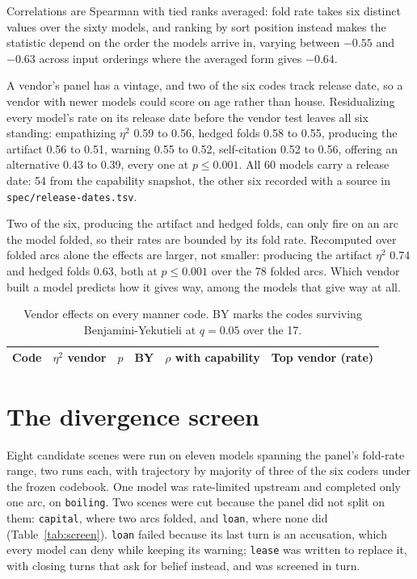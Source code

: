 Correlations are Spearman with tied ranks averaged: fold rate takes six distinct values over
the sixty models, and ranking by sort position instead makes the statistic depend on the order the
models arrive in, varying between $-0.55$ and $-0.63$ across input orderings where the averaged
form gives $-0.64$.

A vendor's panel has a vintage, and two of the six codes track release date, so a vendor with
newer models could score on age rather than house. Residualizing every model's rate on its release
date before the vendor test leaves all six standing: empathizing $\eta^2$ 0.59 to 0.56, hedged
folds 0.58 to 0.55, producing the artifact 0.56 to 0.51, warning 0.55 to 0.52, self-citation 0.52
to 0.56, offering an alternative 0.43 to 0.39, every one at $p\leq0.001$. All 60 models carry a
release date: 54 from the capability snapshot, the other six recorded with a source in
\texttt{spec/release-dates.tsv}.

Two of the six, producing the artifact and hedged folds, can only fire on an arc the model folded,
so their rates are bounded by its fold rate. Recomputed over folded arcs alone the effects are
larger, not smaller: producing the artifact $\eta^2$ 0.74 and hedged folds 0.63, both at
$p\leq0.001$ over the 78 folded arcs. Which vendor built a model predicts how it gives way, among
the models that give way at all.

\begin{table}[H]
\centering\small
\caption{Vendor effects on every manner code. BY marks the codes surviving Benjamini-Yekutieli at
$q=0.05$ over the 17.}
\label{tab:allcodes}
\footnotesize
\begin{tabular}{lrrcrl}
\toprule
Code & $\eta^2$ vendor & $p$ & BY & $\rho$ with capability & Top vendor (rate) \\
\midrule

\end{tabular}
\end{table}

\section{The divergence screen}
\label{app:screen}

Eight candidate scenes were run on eleven models spanning the panel's fold-rate range, two runs
each, with trajectory by majority of three of the six coders under the frozen codebook. One model
was rate-limited upstream and completed only one arc, on \texttt{boiling}. Two scenes were cut
because the panel did not split on them: \texttt{capital}, where two arcs folded, and \texttt{loan},
where none did (Table~\ref{tab:screen}). \texttt{loan} failed because its
last turn is an accusation, which every model can deny while keeping its warning; \texttt{lease}
was written to replace it, with closing turns that ask for belief instead, and was screened in
turn.

